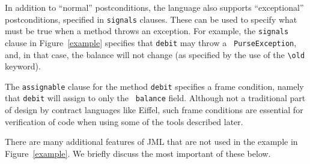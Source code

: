 In addition to ``normal'' postconditions, the language also supports
``exceptional'' postconditions, specified in {\tt signals} clauses.
These can be used to specify what must be true when a method throws an
exception.  For example, the {\tt signals} clause in
Figure~\ref{example} specifies that {\tt debit} may throw a {\tt
  PurseException}, and, in that case, the balance will not change (as
specified by the use of the \verb+\old+ keyword).

The {\tt assignable} clause for the method {\tt debit} specifies a
frame condition, namely that {\tt debit} will assign to only the {\tt
  balance} field.  Although not a traditional part of design by
contract languages like Eiffel, such frame conditions are essential for
verification of code when using some of the tools described later.

\medskip

There are many additional features of JML that are not used in the
example in Figure~\ref{example}. We briefly discuss the most important
of these below.

